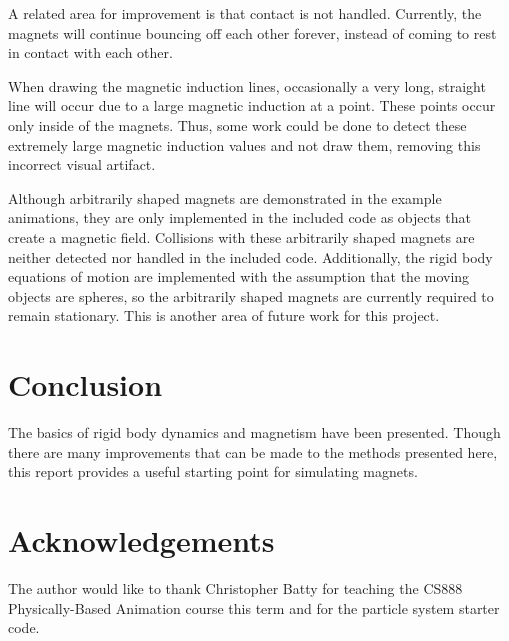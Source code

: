 \documentclass[tog]{acmsiggraph}
\begin{document}
A related area for improvement is that contact is not handled. Currently, the magnets will continue bouncing off each other forever, instead of coming to rest in contact with each other.

When drawing the magnetic induction lines, occasionally a very long, straight line will occur due to a large magnetic induction at a point. These points occur only inside of the magnets. Thus, some work could be done to detect these extremely large magnetic induction values and not draw them, removing this incorrect visual artifact.

Although arbitrarily shaped magnets are demonstrated in the example animations, they are only implemented in the included code as objects that create a magnetic field. Collisions with these arbitrarily shaped magnets are neither detected nor handled in the included code. Additionally, the rigid body equations of motion are implemented with the assumption that the moving objects are spheres, so the arbitrarily shaped magnets are currently required to remain stationary. This is another area of future work for this project.

\section{Conclusion}

The basics of rigid body dynamics and magnetism have been presented. Though there are many improvements that can be made to the methods presented here, this report provides a useful starting point for simulating magnets.

\section*{Acknowledgements}

The author would like to thank Christopher Batty for teaching the CS888 Physically-Based Animation course this term and for the particle system starter code.




\end{document}

